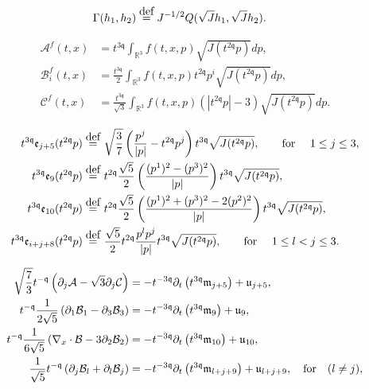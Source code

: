 \documentclass[10pt,a4paper]{amsart}
\newcommand{\eqdef }{\overset{\mbox{\tiny{def}}}{=}}
\newcommand{\pZ}{|\pv|}
\newcommand{\pv}{p}
\newcommand{\qq}{\mathfrak{q}}
\newcommand{\rth}{{\mathbb{R}^3}}
\newcommand{\tTq}{t^{3\qq}}
\newcommand{\tmTq}{t^{-3\qq}}
\newcommand{\tmq}{t^{-\qq}}
\newcommand{\tqq}{t^{2\qq}}
\begin{document}
\begin{align}
\Gamma (h_1,h_2)
&\eqdef
 J^{-1/2}Q(\sqrt{J} h_1,\sqrt{J} h_2).
\label{gamma0}
\end{align}

\begin{equation}\label{defmacrocoef}
\begin{split}
    \mathcal{A}^f(t,x) & = \tTq\int_\rth f(t,x,\pv)\sqrt{J(\tqq p)}dp,
    \\
    \mathcal{B}_i^f (t,x)
    & =
    \frac{\tTq}{2}\int_\rth f(t,x,\pv) \tqq p^i\sqrt{J(\tqq p)}dp, 
    \\
    \mathcal{C}^f(t,x)
    &=
    \frac{\tTq}{\sqrt{3}}\int_{\rth}f(t,x,\pv)( |\tqq \pv |-3)\sqrt{J(\tqq p)} dp.
\end{split}
\end{equation}

\begin{equation}\label{orthogonal.basis.use}
    \begin{split}
         \tTq \mathfrak{e}_{j+5}(\tqq \pv) \eqdef &~ 
   \sqrt{\frac{3}{7}}
\left(\frac{p^j}{{\pZ}} -\tqq \pv^j\right)\tTq\sqrt{J(\tqq p)},\qquad  \text{for }\quad 1\leq j \leq 3,
      \\ 
   \tTq \mathfrak{e}_{9}(\tqq \pv) \eqdef &~ 
{t^{2\qq}} \frac{\sqrt{5}}{2}\left(\frac{(p^1)^2 -(p^3)^2}{{|p|}} \right)t^{3\qq}\sqrt{J(t^{2\qq} p)},
      \\ 
   \tTq \mathfrak{e}_{10}(\tqq \pv) \eqdef &~ 
{t^{2\qq}} \frac{\sqrt{5}}{2} \left(\frac{(p^1)^2+(p^3)^2 -2(p^2)^2}{{|p|}} \right)t^{3\qq}\sqrt{J(t^{2\qq} p)},
      \\ 
   \tTq \mathfrak{e}_{i+j+8}(\tqq \pv) \eqdef &~ 
\frac{\sqrt{5}}{2}{\tqq}\frac{ \pv^l \pv^{j}}{|p|}\tTq\sqrt{J(\tqq p)},\qquad  \text{for }\quad  1\leq l<j \leq 3.
    \end{split}
\end{equation}

\begin{align} \notag
\sqrt{\frac{7}{3}}\tmq\left(\partial_j\mathcal{A}
-
\sqrt{3}\partial_j\mathcal{C} \right)
&=-\tmTq  \partial_t\left( \tTq \mathfrak{m}_{j+5} \right)+\mathfrak{u}_{j+5}, 
\\  \label{macroscopic}
\tmq\frac{1}{2\sqrt{5}} \left( \partial_1 \mathcal{B}_1 - \partial_3 \mathcal{B}_3\right)
&=-\tmTq  \partial_t\left( \tTq \mathfrak{m}_{9} \right)+\mathfrak{u}_{9},
 \\ \notag
\tmq\frac{1}{6\sqrt{5}}\left( \nabla_x\cdot \mathcal{B}-3\partial_2 \mathcal{B}_2\right)
&=-\tmTq  \partial_t\left( \tTq \mathfrak{m}_{10} \right)+\mathfrak{u}_{10},
 \\ \notag
\frac{1}{\sqrt{5}}  \tmq\left(\partial_j \mathcal{B}_{l}+\partial_l \mathcal{B}_{j} \right)
&=-\tmTq  \partial_t\left( \tTq \mathfrak{m}_{l+j+9} \right)+\mathfrak{u}_{l+j+9},\quad \text{for}
\quad (l\neq j),
\end{align}
\end{document}
